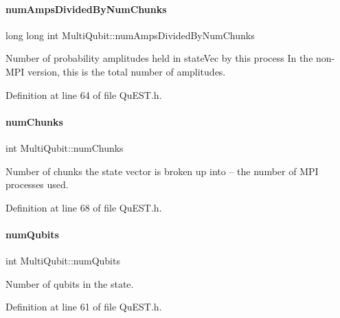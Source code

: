 \paragraph{\texorpdfstring{num\+Amps\+Divided\+By\+Num\+Chunks}{numAmpsDividedByNumChunks}}
{\footnotesize\ttfamily long long int Multi\+Qubit\+::num\+Amps\+Divided\+By\+Num\+Chunks}



Number of probability amplitudes held in state\+Vec by this process In the non-\/\+M\+PI version, this is the total number of amplitudes. 



Definition at line 64 of file Qu\+E\+S\+T.\+h.

\mbox{\label{structMultiQubit_acd43f2f57991709c9e94f73662c972b2}} 
\paragraph{\texorpdfstring{num\+Chunks}{numChunks}}
{\footnotesize\ttfamily int Multi\+Qubit\+::num\+Chunks}



Number of chunks the state vector is broken up into -- the number of M\+PI processes used. 



Definition at line 68 of file Qu\+E\+S\+T.\+h.

\mbox{\label{structMultiQubit_ab5b9795bdc6fb5855e1974dcbbaeb36f}} 
\paragraph{\texorpdfstring{num\+Qubits}{numQubits}}
{\footnotesize\ttfamily int Multi\+Qubit\+::num\+Qubits}



Number of qubits in the state. 



Definition at line 61 of file Qu\+E\+S\+T.\+h.

\mbox{\label{structMultiQubit_a76f7db4eab52d2b30f58f973ada809c5}} 
